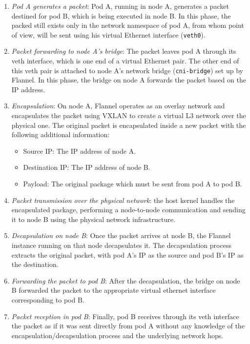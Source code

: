 \begin{enumerate}
  \itemsep0em
  \item \textit{Pod A generates a packet}: Pod A, running in node A, generates a
    packet destined for pod B, which is being executed in node B. In this phase,
    the packed still exists only in the network namespace of pod A, from whom
    point of view, will be sent using his virtual Ethernet interface
    (\texttt{veth0}).
  \item \textit{Packet forwarding to node A's bridge}: The packet leaves pod A
    through its veth interface, which is one end of a virtual Ethernet pair. The
    other end of this veth pair is attached to node A's network bridge
    (\texttt{cni-bridge}) set up by Flannel.
    In this phase, the bridge on node A forwards the packet based on the IP
    address.
  \item \textit{Encapsulation}: On node A, Flannel operates as an overlay
    network and encapsulates the packet using VXLAN to create a virtual L3 network
    over the physical one. The original packet is encapsulated inside a new packet
    with the following additional information:
    \begin{itemize}
      \item Source IP: The IP address of node A.
      \item Destination IP: The IP address of node B.
      \item Payload: The original package which must be sent from pod A to pod B.
    \end{itemize}
  \item \textit{Packet transmission over the physical network}: the host kernel
    handles the encapsulated package, performing a node-to-node communication
    and sending it to node B using the physical network infrastructure.
  \item \textit{Decapsulation on node B}: Once the packet arrives at node B, the
    Flannel instance running on that node decapsulates it. The decapsulation
    process extracts the original packet, with pod A's IP as the source and pod
    B's IP as the destination.
  \item \textit{Forwarding the packet to pod B}: After the decapsulation, the
    bridge on node B forwarded the packet to the appropriate virtual ethernet
    interface corresponding to pod B.
  \item \textit{Packet reception in pod B}: Finally, pod B receives through its
    veth interface the packet as if it was sent directly from pod A without any
    knowledge of the encapsulation/decapsulation process and the underlying
    network hops.
\end{enumerate}

